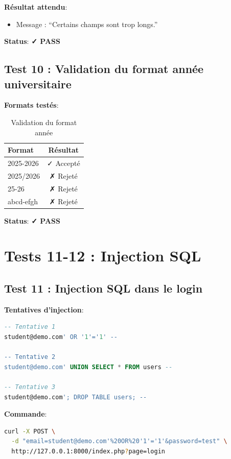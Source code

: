 \documentclass[11pt,a4paper,french]{report}
\newcommand{\pass}{\cellcolor{pass}\textbf{\color{white}✓ PASS}}
\begin{document}
\textbf{Résultat attendu}:
\begin{itemize}
    \item Message : ``Certains champs sont trop longs.''
\end{itemize}

\textbf{Status}: \pass

\subsection{Test 10 : Validation du format année universitaire}

\textbf{Formats testés}:
\begin{table}[H]
\centering
\caption{Validation du format année}
\begin{tabular}{|l|c|}
\hline
\textbf{Format} & \textbf{Résultat} \\
\hline
2025-2026 & ✓ Accepté \\
\hline
2025/2026 & ✗ Rejeté \\
\hline
25-26 & ✗ Rejeté \\
\hline
abcd-efgh & ✗ Rejeté \\
\hline
\end{tabular}
\end{table}

\textbf{Status}: \pass

\newpage

\section{Tests 11-12 : Injection SQL}

\subsection{Test 11 : Injection SQL dans le login}

\textbf{Tentatives d'injection}:
\begin{lstlisting}[language=sql]
-- Tentative 1
student@demo.com' OR '1'='1' --

-- Tentative 2
student@demo.com' UNION SELECT * FROM users --

-- Tentative 3
student@demo.com'; DROP TABLE users; --
\end{lstlisting}

\textbf{Commande}:
\begin{lstlisting}[language=bash]
curl -X POST \
  -d "email=student@demo.com'%20OR%20'1'='1'&password=test" \
  http://127.0.0.1:8000/index.php?page=login
\end{lstlisting}
\end{document}
